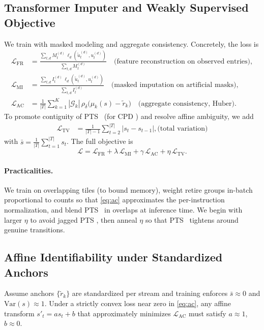 \documentclass[conference]{IEEEtran}
\newcommand{\Var}{\mathrm{Var}}
\newcommand{\pts}{\textsc{PTS} }
\newcommand{\cpd}{\textsc{CPD} }
\begin{document}
\subsection{Transformer Imputer and Weakly Supervised Objective}
We train with masked modeling and aggregate consistency. Concretely, the loss is
\begin{align}
\mathcal{L}_{\mathrm{FR}} &=\frac{\sum_{t,d}M_t^{(d)}\,\ell_d(\tilde{u}_t^{(d)},u_t^{(d)})}{\sum_{t,d}M_t^{(d)}}
\quad\text{(feature reconstruction on observed entries)}, \nonumber\\
\mathcal{L}_{\mathrm{MI}} &=\frac{\sum_{t,d}I_t^{(d)}\,\ell_d(\tilde{u}_t^{(d)},u_t^{(d)})}{\sum_{t,d}I_t^{(d)}}
\quad\text{(masked imputation on artificial masks)}, \nonumber\\
\mathcal{L}_{\mathrm{AC}} &= \frac{1}{|T|}\sum_{k=1}^K |\mathcal{G}_k|\,\rho_\delta\!\big(\mu_k(s)-\tilde{r}_k\big)
\quad\text{(aggregate consistency, Huber)}. \label{eq:ac}
\end{align}
To promote contiguity of \pts\ (for \cpd) and resolve affine ambiguity, we add 
\begin{align}
\mathcal{L}_{\mathrm{TV}} &= \frac{1}{|T|-1}\sum_{t=2}^{|T|} |s_t-s_{t-1}|, \text{(total\ variation)}
\end{align}
with \(\bar{s}=\tfrac{1}{|T|}\sum_{t=1}^{|T|} s_t\).
The full objective is
\begin{equation}
\mathcal{L} =\mathcal{L}_{\mathrm{FR}} + \lambda\,\mathcal{L}_{\mathrm{MI}} + \gamma\,\mathcal{L}_{\mathrm{AC}} +  \eta\,\mathcal{L}_{\mathrm{TV}}. \label{eq:full}
\end{equation}

\paragraph{Practicalities.}
We train on overlapping tiles (to bound memory), weight retire groups in-batch proportional to counts so that \eqref{eq:ac} approximates the per-instruction normalization, and blend \pts\ in overlaps at inference time. We begin with larger \(\eta\) to avoid jagged \pts, then anneal \(\eta\) so that \pts\ tightens around genuine transitions.

\subsection{Affine Identifiability under Standardized Anchors}
\label{subsec:identifiability}
Assume anchors \(\{\tilde{r}_k\}\) are standardized per stream and training enforces \(\bar{s}\!\approx\!0\) and \(\Var(s)\!\approx\!1\). Under a strictly convex loss near zero in \eqref{eq:ac}, any affine transform \(s'_t=a s_t+b\) that approximately minimizes \(\mathcal{L}_{\mathrm{AC}}\) must satisfy \(a\!\approx\!1\), \(b\!\approx\!0\).
 
\end{document}
